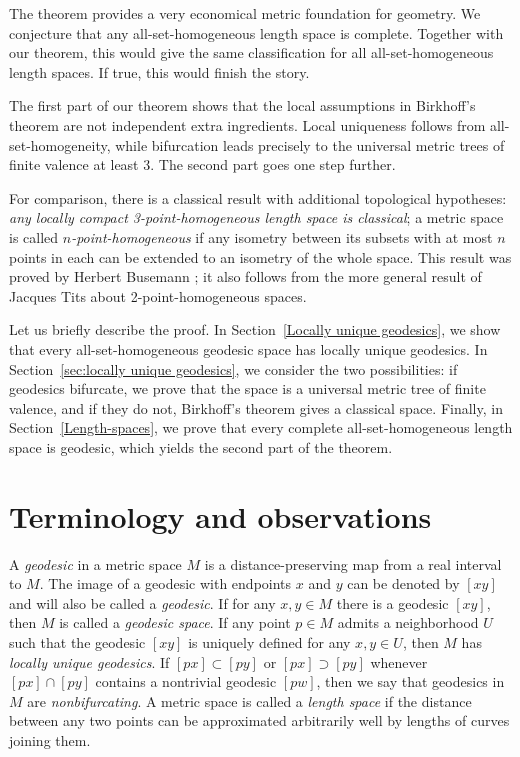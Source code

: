 \documentclass[leqno,a4paper,10pt]{article}
\begin{document}
The theorem provides a very economical metric foundation for geometry.
We conjecture that any all-set-homogeneous length space is complete.
Together with our theorem, this would give the same classification for all all-set-homogeneous length spaces.
If true, this would finish the story.

The first part of our theorem shows that the local assumptions in Birkhoff's theorem are not independent extra ingredients.
Local uniqueness follows from all-set-homogeneity, while bifurcation leads precisely to the universal metric trees of finite valence at least 3.
The second part goes one step further.

For comparison, there is a classical result with additional topological hypotheses: \emph{any locally compact 3-point-homogeneous length space is classical};
a metric space is called \emph{$n$-point-homogeneous} if any isometry between its subsets with at most $n$ points in each can be extended to an isometry of the whole space.
This result was proved by Herbert Busemann \cite{busemann}; it also follows from the more general result of Jacques Tits \cite{tits} about 2-point-homogeneous spaces.

Let us briefly describe the proof.
In Section~\ref{Locally unique geodesics}, we show that every all-set-homogeneous geodesic space has locally unique geodesics.
In Section~\ref{sec:locally unique geodesics}, we consider the two possibilities:
if geodesics bifurcate, we prove that the space is a universal metric tree of finite valence, and if they do not, Birkhoff's theorem gives a classical space.
Finally, in Section~\ref{Length-spaces}, we prove that every complete all-set-homogeneous length space is geodesic, which yields the second part of the theorem.

\section{Terminology and observations}

A \emph{geodesic} in a metric space $M$ is a distance-preserving map from a real interval to $M$.
The image of a geodesic with endpoints $x$ and $y$ can be denoted by $[xy]$ and will also be called a \emph{geodesic}.
If for any $x,y\in M$ there is a geodesic $[xy]$, then $M$ is called a \emph{geodesic space}.
If any point $p\in M$ admits a neighborhood $U$ such that the geodesic $[xy]$ is uniquely defined for any $x,y\in U$,
then $M$ has \emph{locally unique geodesics}.
If $[px]\subset [py]$ or $[px]\supset [py]$ whenever $[px]\cap [py]$ contains a nontrivial geodesic $[pw]$,
then we say that geodesics in $M$ are \emph{nonbifurcating}.
A metric space is called a \emph{length space} if the distance between any two points can be approximated arbitrarily well by lengths of curves joining them.
\end{document}

